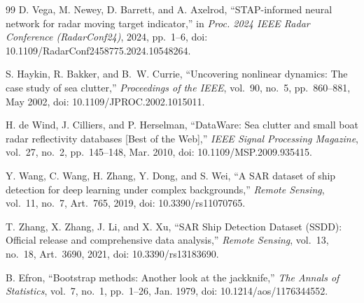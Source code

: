 \documentclass[journal]{IEEEtran}
\begin{document}
\begin{thebibliography}{99}
D. Vega, M. Newey, D. Barrett, and A. Axelrod, ``STAP-informed neural network for radar moving target indicator,'' in \emph{Proc. 2024 IEEE Radar Conference (RadarConf24)}, 2024, pp.~1--6, doi: 10.1109/RadarConf2458775.2024.10548264.

S. Haykin, R. Bakker, and B.~W. Currie, ``Uncovering nonlinear dynamics: The case study of sea clutter,'' \emph{Proceedings of the IEEE}, vol.~90, no.~5, pp.~860--881, May 2002, doi: 10.1109/JPROC.2002.1015011.

H. de Wind, J. Cilliers, and P. Herselman, ``DataWare: Sea clutter and small boat radar reflectivity databases [Best of the Web],'' \emph{IEEE Signal Processing Magazine}, vol.~27, no.~2, pp.~145--148, Mar. 2010, doi: 10.1109/MSP.2009.935415.

Y. Wang, C. Wang, H. Zhang, Y. Dong, and S. Wei, ``A SAR dataset of ship detection for deep learning under complex backgrounds,'' \emph{Remote Sensing}, vol.~11, no.~7, Art.~765, 2019, doi: 10.3390/rs11070765.

T. Zhang, X. Zhang, J. Li, and X. Xu, ``SAR Ship Detection Dataset (SSDD): Official release and comprehensive data analysis,'' \emph{Remote Sensing}, vol.~13, no.~18, Art.~3690, 2021, doi: 10.3390/rs13183690.

B. Efron, ``Bootstrap methods: Another look at the jackknife,'' \emph{The Annals of Statistics}, vol.~7, no.~1, pp.~1--26, Jan. 1979, doi: 10.1214/aos/1176344552.

\end{thebibliography}
\endgroup
\end{document}
